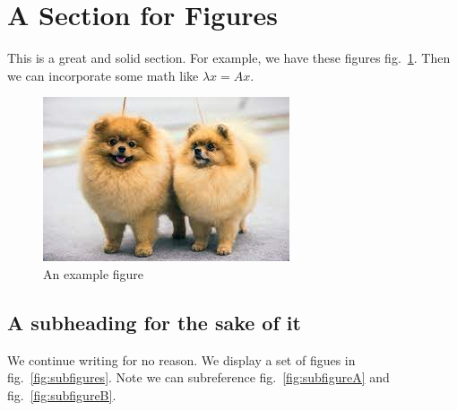 \documentclass[
]{article}
\begin{document}
\hypertarget{a-section-for-figures}{%
\section{A Section for Figures}\label{a-section-for-figures}}

This is a great and solid section. For example, we have these figures
fig.~\ref{fig:figure1}. Then we can incorporate some math like
\(\lambda x = Ax\).

\begin{figure}
\hypertarget{fig:figure1}{%
\centering
\includegraphics{./figures/dogs.jpeg}
\caption{An example figure}\label{fig:figure1}
}
\end{figure}

\hypertarget{a-subheading-for-the-sake-of-it}{%
\subsection{A subheading for the sake of
it}\label{a-subheading-for-the-sake-of-it}}

We continue writing for no reason. We display a set of figues in
fig.~\ref{fig:subfigures}. Note we can subreference
fig.~\ref{fig:subfigureA} and fig.~\ref{fig:subfigureB}.
\end{document}
